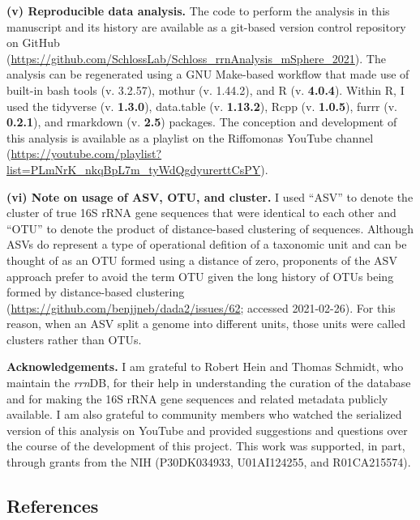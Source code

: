 \documentclass[
]{article}
\begin{document}
\textbf{(v) Reproducible data analysis.} The code to perform the
analysis in this manuscript and its history are available as a git-based
version control repository on GitHub
(\url{https://github.com/SchlossLab/Schloss_rrnAnalysis_mSphere_2021}).
The analysis can be regenerated using a GNU Make-based workflow that
made use of built-in bash tools (v. 3.2.57), mothur (v. 1.44.2), and R
(v. \textbf{4.0.4}). Within R, I used the tidyverse (v. \textbf{1.3.0}),
data.table (v. \textbf{1.13.2}), Rcpp (v. \textbf{1.0.5}), furrr (v.
\textbf{0.2.1}), and rmarkdown (v. \textbf{2.5}) packages. The
conception and development of this analysis is available as a playlist
on the Riffomonas YouTube channel
(\url{https://youtube.com/playlist?list=PLmNrK_nkqBpL7m_tyWdQgdyurerttCsPY}).

\textbf{(vi) Note on usage of ASV, OTU, and cluster.} I used ``ASV'' to
denote the cluster of true 16S rRNA gene sequences that were identical
to each other and ``OTU'' to denote the product of distance-based
clustering of sequences. Although ASVs do represent a type of
operational defition of a taxonomic unit and can be thought of as an OTU
formed using a distance of zero, proponents of the ASV approach prefer
to avoid the term OTU given the long history of OTUs being formed by
distance-based clustering
(\url{https://github.com/benjjneb/dada2/issues/62}; accessed
2021-02-26). For this reason, when an ASV split a genome into different
units, those units were called clusters rather than OTUs.

\vspace{20mm}

\textbf{Acknowledgements.} I am grateful to Robert Hein and Thomas
Schmidt, who maintain the \emph{rrn}DB, for their help in understanding
the curation of the database and for making the 16S rRNA gene sequences
and related metadata publicly available. I am also grateful to community
members who watched the serialized version of this analysis on YouTube
and provided suggestions and questions over the course of the
development of this project. This work was supported, in part, through
grants from the NIH (P30DK034933, U01AI124255, and R01CA215574).

\newpage

\hypertarget{references}{%
\subsection{References}\label{references}}

\setlength{\parindent}{-0.25in}
\setlength{\leftskip}{0.25in}
\end{document}
